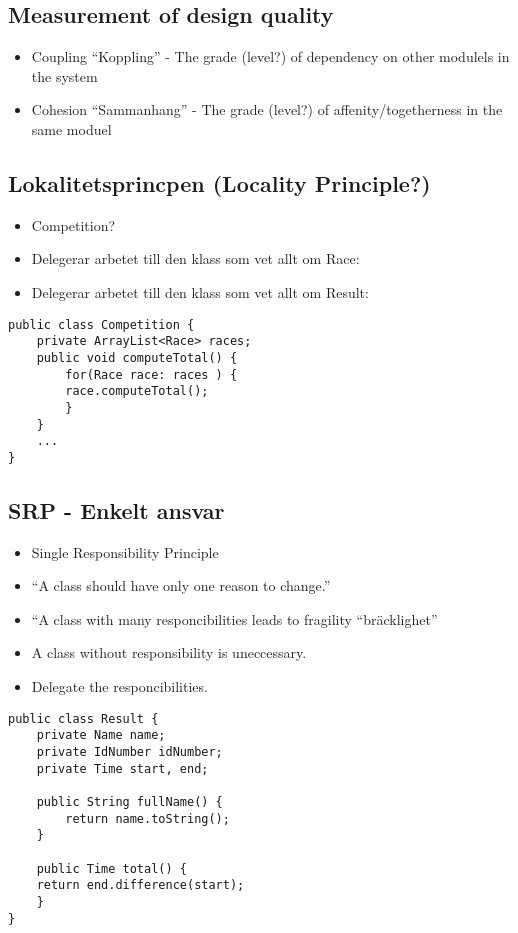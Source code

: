 \documentclass[11pt]{amsart}
\begin{document}
\subsection{Measurement of design quality}
\begin{itemize}
  \item Coupling ``Koppling'' - The grade (level?) of dependency on other
  modulels in the system
  \item Cohesion ``Sammanhang'' - The grade (level?) of affenity/togetherness in
  the same moduel 
\end{itemize}

\subsection{Lokalitetsprincpen (Locality Principle?)}
\begin{itemize}
  \item Competition? 
  \item Delegerar arbetet till den klass som vet allt om Race:
  \item Delegerar arbetet till den klass som vet allt om Result:
\end{itemize}
\begin{lstlisting}
public class Competition {
	private ArrayList<Race> races; 
	public void computeTotal() {
		for(Race race: races ) { 
		race.computeTotal();
		} 
	}	
	...
}
\end{lstlisting}

\subsection{SRP - Enkelt ansvar}

\begin{itemize}
  \item Single Responsibility Principle
  \item ``A class should have only one reason to change.''
  \item ``A class with many responcibilities leads to fragility ``bräcklighet''
  \item A class without responsibility is uneccessary. 
  \item Delegate the responcibilities.
\end{itemize}

\begin{lstlisting}
public class Result {
	private Name name;
	private IdNumber idNumber; 
	private Time start, end;
	 
	public String fullName() {
		return name.toString(); 
	}
	
	public Time total() {
	return end.difference(start);
	}
}
\end{lstlisting}
\end{document}
